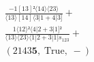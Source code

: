 \documentclass[varwidth, border=5pt]{standalone}
\begin{document}
\begin{my}
$\begin{gathered}
\scriptscriptstyle\frac{-1[13]²⟨14⟩⟨23⟩}{⟨13⟩[14]⟨3|1+4|3]} +\\
\scriptscriptstyle\frac{1⟨12⟩²⟨4|2+3|1]²}{⟨13⟩⟨23⟩⟨1|2+3|1]s_{123}} +\\
\scriptscriptstyle(2143𝟓,\;\text{True},\;-) \phantom{+}
\end{gathered}$
\end{my}
\end{document}
